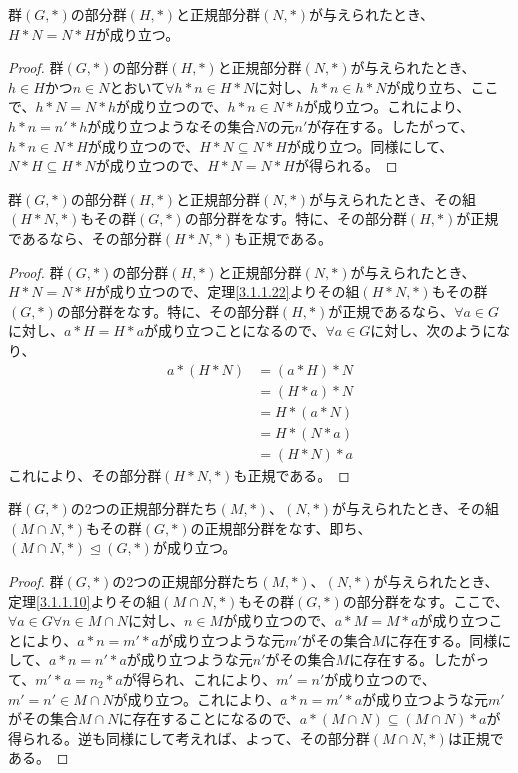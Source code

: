 \documentclass[dvipdfmx]{jsarticle}
\begin{document}
\begin{dfn}
\begin{thm}\label{3.1.1.26}
群$(G,*)$の部分群$(H,*)$と正規部分群$(N,*)$が与えられたとき、$H*N = N*H$が成り立つ。
\end{thm}
\begin{proof}
群$(G,*)$の部分群$(H,*)$と正規部分群$(N,*)$が与えられたとき、$h \in H$かつ$n \in N$とおいて$\forall h*n \in H*N$に対し、$h*n \in h*N$が成り立ち、ここで、$h*N = N*h$が成り立つので、$h*n \in N*h$が成り立つ。これにより、$h*n = n'*h$が成り立つようなその集合$N$の元$n'$が存在する。したがって、$h*n \in N*H$が成り立つので、$H*N \subseteq N*H$が成り立つ。同様にして、$N*H \subseteq H*N$が成り立つので、$H*N = N*H$が得られる。
\end{proof}
\begin{thm}\label{3.1.1.27}
群$(G,*)$の部分群$(H,*)$と正規部分群$(N,*)$が与えられたとき、その組$(H*N,*)$もその群$(G,*)$の部分群をなす。特に、その部分群$(H,*)$が正規であるなら、その部分群$(H*N,*)$も正規である。
\end{thm}
\begin{proof}
群$(G,*)$の部分群$(H,*)$と正規部分群$(N,*)$が与えられたとき、$H*N = N*H$が成り立つので、定理\ref{3.1.1.22}よりその組$(H*N,*)$もその群$(G,*)$の部分群をなす。特に、その部分群$(H,*)$が正規であるなら、$\forall a \in G$に対し、$a*H = H*a$が成り立つことになるので、$\forall a \in G$に対し、次のようになり、
\begin{align*}
a*(H*N) &= (a*H)*N\\
&= (H*a)*N\\
&= H*(a*N)\\
&= H*(N*a)\\
&= (H*N)*a
\end{align*}
これにより、その部分群$(H*N,*)$も正規である。
\end{proof}
\begin{thm}\label{3.1.1.28}
群$(G,*)$の2つの正規部分群たち$(M,*)$、$(N,*)$が与えられたとき、その組$(M \cap N,*)$もその群$(G,*)$の正規部分群をなす、即ち、$(M \cap N,*) \trianglelefteq (G,*)$が成り立つ。
\end{thm}
\begin{proof}
群$(G,*)$の2つの正規部分群たち$(M,*)$、$(N,*)$が与えられたとき、定理\ref{3.1.1.10}よりその組$(M \cap N,*)$もその群$(G,*)$の部分群をなす。ここで、$\forall a \in G\forall n \in M \cap N$に対し、$n \in M$が成り立つので、$a*M = M*a$が成り立つことにより、$a*n = m'*a$が成り立つような元$m'$がその集合$M$に存在する。同様にして、$a*n = n'*a$が成り立つような元$n'$がその集合$M$に存在する。したがって、$m'*a = n_{2}*a$が得られ、これにより、$m' = n'$が成り立つので、$m' = n' \in M \cap N$が成り立つ。これにより、$a*n = m'*a$が成り立つような元$m'$がその集合$M \cap N$に存在することになるので、$a*(M \cap N) \subseteq (M \cap N)*a$が得られる。逆も同様にして考えれば、よって、その部分群$(M \cap N,*)$は正規である。

\end{proof}
\end{dfn}
\end{document}
